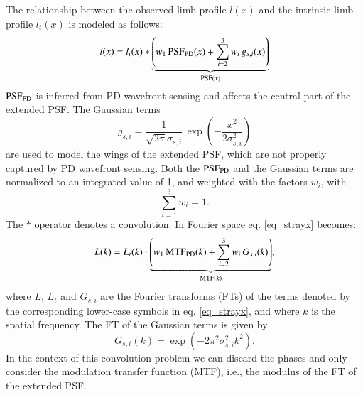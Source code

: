 \documentclass[goettingen, gauss, print]{thesis}
\begin{document}
The relationship between the observed limb profile $l(x)$ and the intrinsic limb profile $l_{t}(x)$ is modeled as follows:
\begin{equation}
  l(x) = l_{t}(x) \ast \underbrace{ \left(w_{1} \, \mathrm{PSF}_{\mathrm{PD}}(x) + \sum_{i=2}^{3} w_{i} \, g_{s,i}(x) \right) }_{\mathrm{PSF}(x)}
\label{eq_strayx}
\end{equation} 
$\mathrm{PSF}_{\mathrm{PD}}$ is inferred from PD wavefront sensing and affects the central part of the extended PSF. The Gaussian terms
\begin{equation}
\label{eq_gauss}
g_{s,i} = \frac{1}{\sqrt{2 \pi} \sigma_{s,i}} \, \exp \left(-\frac{x^2}{2
  \sigma_{s,i}^2} \right)
\end{equation} 
are used to model the wings of the extended PSF, which are not properly captured by PD wavefront sensing. Both the $\mathrm{PSF}_{\mathrm{PD}}$ and the Gaussian terms are normalized to an integrated value of 1, and weighted with the factors $w_i$, with
\begin{equation}
\label{eq_weights}
  \sum_{i=1}^{3} w_{i} = 1. 
\end{equation}
The $\ast$ operator denotes a convolution.
In Fourier space eq. \ref{eq_strayx} becomes:
\begin{equation}
L(k) = L_{t}(k) \cdot \underbrace{ \left(w_{1} \, \mathrm{MTF}_{\mathrm{PD}}(k) + \sum_{i=2}^{3}
  w_{i} \, G_{s,i}(k) \right) }_{\mathrm{MTF}(k)},
\label{eq_strayk}
\end{equation}
where $L$, $L_{t}$ and $G_{s,i}$ are the Fourier transforms (FTs) of the terms denoted by the corresponding lower-case symbols in eq. \ref{eq_strayx}, and where $k$ is the spatial frequency. The FT of the Gaussian terms is given by
\begin{equation}
\label{eq_ftgauss}
  G_{s,i}(k) = \exp(-2 \pi^2 \sigma_{s,i}^2 k^2).
\end{equation}
In the context of this convolution problem we can discard the phases and only consider the modulation transfer function (MTF), i.e., the modulus of the FT of the extended PSF. \\
\end{document}

